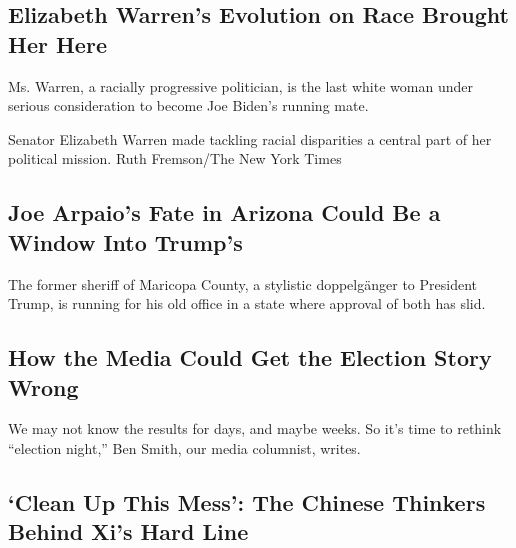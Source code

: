 \hypertarget{elizabeth-warrens-evolution-on-race-brought-her-here}{%
\subsection{Elizabeth Warren's Evolution on Race Brought Her
Here}\label{elizabeth-warrens-evolution-on-race-brought-her-here}}

Ms. Warren, a racially progressive politician, is the last white woman
under serious consideration to become Joe Biden's running mate.

\href{/2020/08/02/us/politics/elizabeth-warren-biden-vice-president.html}{}

Senator Elizabeth Warren made tackling racial disparities a central part
of her political mission. Ruth Fremson/The New York Times

\href{/2020/08/02/us/politics/arizona-election-joe-arpaio.html}{}

\hypertarget{joe-arpaios-fate-in-arizona-could-be-a-window-into-trumps}{%
\subsection{Joe Arpaio's Fate in Arizona Could Be a Window Into
Trump's}\label{joe-arpaios-fate-in-arizona-could-be-a-window-into-trumps}}

The former sheriff of Maricopa County, a stylistic doppelgänger to
President Trump, is running for his old office in a state where approval
of both has slid.

\href{/2020/08/02/business/media/election-coverage.html}{}

\hypertarget{how-the-media-could-get-the-election-story-wrong}{%
\subsection{How the Media Could Get the Election Story
Wrong}\label{how-the-media-could-get-the-election-story-wrong}}

We may not know the results for days, and maybe weeks. So it's time to
rethink ``election night,'' Ben Smith, our media columnist, writes.

\href{/2020/08/02/world/asia/china-hong-kong-national-security-law.html}{}

\hypertarget{clean-up-this-mess-the-chinese-thinkers-behind-xis-hard-line}{%
\subsection{`Clean Up This Mess': The Chinese Thinkers Behind Xi's Hard
Line}\label{clean-up-this-mess-the-chinese-thinkers-behind-xis-hard-line}}

